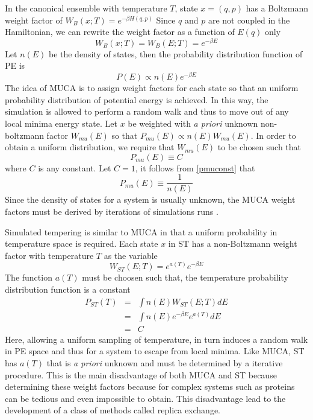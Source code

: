 \documentclass[12pt]{article}
\numberwithin{equation}{subsection}
\begin{document}
\begin{spacing}{1}
In the canonical ensemble with temperature $T$, state $x =(q,p)$ has a Boltzmann weight factor of $W_B(x;T) = e^{-\beta H(q,p)}$
Since $q$ and $p$ are not coupled in the Hamiltonian, we can rewrite the weight factor as a function of $E(q)$ only
\begin{equation}
W_B(x;T) = W_B(E;T) = e^{-\beta E}
\end{equation}
Let $n(E)$ be the density of states, then the probability distribution function of PE is 
\begin{equation}
P(E) \propto n(E)e^{-\beta E}
\end{equation}
The idea of MUCA is to assign weight factors for each state so that an uniform probability distribution of potential energy is achieved. In this way, the simulation is allowed to perform a random walk and thus to move out of any local minima energy state. Let $x$ be weighted with \textit{a priori} unknown non-boltzmann factor $W_{mu}(E)$ so that $P_{mu}(E) \propto n(E)W_{mu}(E)$. In order to obtain a uniform distribution, we require that $W_{mu}(E)$ to be chosen such that  
\begin{equation}\label{pmuconst}
P_{mu}(E) \equiv C
\end{equation}
where $C$ is any constant. Let $C=1$, it follows from \ref{pmuconst} that 
\begin{equation}
P_{mu}(E) \equiv \frac{1}{n(E)}
\end{equation}
Since the density of states for a system is usually unknown, the MUCA weight factors must be derived by iterations of simulations runs \cite{oka2001}.

Simulated tempering is similar to MUCA in that a uniform probability in temperature space is required.  Each state $x$ in ST has a non-Boltzmann weight factor with temperature $T$ as the variable
\begin{equation}
W_{ST}(E;T) = e^{a(T)}e^{-\beta E}
\end{equation}
The function $a(T)$ must be choosen such that, the temperature probability distribution function is a constant
\begin{eqnarray}
	P_{ST}(T) &=& \int n(E)W_{ST}(E;T) dE \\
	       &=&\int n(E)e^{-\beta E}e^{a(T)} dE\\
		&=& C
\end{eqnarray} 
Here, allowing a uniform sampling of temperature, in turn induces a random walk in PE space and thus for a system to escape from local minima.  Like MUCA, ST has $a(T)$ that is \textit{a priori} unknown and must be determined by a iterative procedure.  This is the main disadvantage of both MUCA and ST because determining these weight factors because for complex systems such as proteins can be tedious and even impossible to obtain.
This disadvantage lead to the development of a class of methods called replica exchange.


\end{spacing}
\end{document}
